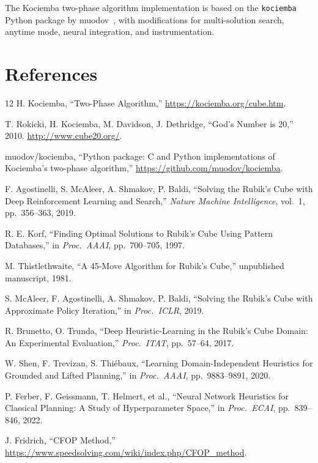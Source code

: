 \documentclass[10pt,twocolumn,a4paper]{article}
\begin{document}
The Kociemba two-phase algorithm implementation is based on the \texttt{kociemba} Python package by muodov~\cite{muodov}, with modifications for multi-solution search, anytime mode, neural integration, and instrumentation.

\section*{References}

\begin{thebibliography}{12}
H. Kociemba, ``Two-Phase Algorithm,'' \url{https://kociemba.org/cube.htm}.

T. Rokicki, H. Kociemba, M. Davidson, J. Dethridge, ``God's Number is 20,'' 2010. \url{http://www.cube20.org/}.

muodov/kociemba, ``Python package: C and Python implementations of Kociemba's two-phase algorithm,'' \url{https://github.com/muodov/kociemba}.

F. Agostinelli, S. McAleer, A. Shmakov, P. Baldi, ``Solving the Rubik's Cube with Deep Reinforcement Learning and Search,'' \textit{Nature Machine Intelligence}, vol.~1, pp.~356--363, 2019.

R. E. Korf, ``Finding Optimal Solutions to Rubik's Cube Using Pattern Databases,'' in \textit{Proc.\ AAAI}, pp.~700--705, 1997.

M. Thistlethwaite, ``A 45-Move Algorithm for Rubik's Cube,'' unpublished manuscript, 1981.

S. McAleer, F. Agostinelli, A. Shmakov, P. Baldi, ``Solving the Rubik's Cube with Approximate Policy Iteration,'' in \textit{Proc.\ ICLR}, 2019.

R. Brunetto, O. Trunda, ``Deep Heuristic-Learning in the Rubik's Cube Domain: An Experimental Evaluation,'' \textit{Proc.\ ITAT}, pp.~57--64, 2017.

W. Shen, F. Trevizan, S. Thi\'ebaux, ``Learning Domain-Independent Heuristics for Grounded and Lifted Planning,'' in \textit{Proc.\ AAAI}, pp.~9883--9891, 2020.

P. Ferber, F. Geissmann, T. Helmert, et al., ``Neural Network Heuristics for Classical Planning: A Study of Hyperparameter Space,'' in \textit{Proc.\ ECAI}, pp.~839--846, 2022.

J. Fridrich, ``CFOP Method,'' \url{https://www.speedsolving.com/wiki/index.php/CFOP_method}.
\end{thebibliography}
\end{document}
